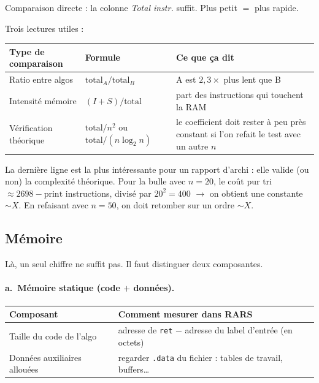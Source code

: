\documentclass[11pt,a4paper]{article}
\begin{document}
Comparaison directe : la colonne \emph{Total instr.} suffit. Plus petit $=$ plus rapide.

Trois lectures utiles :

\begin{table}[h]
\centering
\begin{tabular}{p{4cm} p{5cm} p{6cm}}
\toprule
\textbf{Type de comparaison} & \textbf{Formule} & \textbf{Ce que ça dit} \\
\midrule
Ratio entre algos      & $\text{total}_A / \text{total}_B$ & \guillemotleft{} A est $2{,}3\times$ plus lent que B \guillemotright{} \\
Intensité mémoire      & $(I+S) / \text{total}$            & part des instructions qui touchent la RAM \\
Vérification théorique & $\text{total} / n^2$ ou $\text{total} / (n \log_2 n)$ & le coefficient doit rester à peu près constant si l'on refait le test avec un autre $n$ \\
\bottomrule
\end{tabular}
\end{table}

La dernière ligne est la plus intéressante pour un rapport d'archi : elle valide (ou non) la complexité théorique. Pour la bulle avec $n=20$, le coût \guillemotleft{} pur tri \guillemotright{} $\approx 2698 - \text{print}$ instructions, divisé par $20^2 = 400$ $\rightarrow$ on obtient une constante $\sim X$. En refaisant avec $n=50$, on doit retomber sur un ordre $\sim X$.

\subsection{Mémoire}

Là, un seul chiffre ne suffit pas. Il faut distinguer deux composantes.

\paragraph{a.~Mémoire statique (code $+$ données).}

\begin{table}[h]
\centering
\begin{tabular}{p{5cm} p{9cm}}
\toprule
\textbf{Composant} & \textbf{Comment mesurer dans RARS} \\
\midrule
Taille du code de l'algo     & adresse de \texttt{ret} $-$ adresse du label d'entrée (en octets) \\
Données auxiliaires allouées & regarder \texttt{.data} du fichier : tables de travail, buffers\ldots \\
\bottomrule
\end{tabular}
\end{table}
\end{document}
